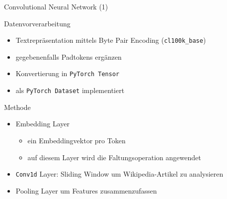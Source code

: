 \documentclass[aspectratio=169]{beamer} %
\begin{document}
\begin{frame}{Convolutional Neural Network (1)}
    \begin{block}{Datenvorverarbeitung}
        \begin{itemize}
            \item Textrepr\"asentation mittels Byte Pair Encoding (\texttt{cl100k\_base})

            \item gegebenenfalls Padtokens erg\"anzen
    
            \item Konvertierung in \texttt{PyTorch Tensor}

            \item als \texttt{PyTorch Dataset} implementiert
        \end{itemize}
    \end{block}

    \begin{block}{Methode}
        \begin{itemize}
            \item Embedding Layer
            \begin{itemize}
                \item ein Embeddingvektor pro Token

                \item auf diesem Layer wird die Faltungsoperation angewendet
            \end{itemize}

            \item \texttt{Conv1d} Layer: Sliding Window um Wikipedia-Artikel zu analysieren

            \item Pooling Layer um Features zusammenzufassen
        \end{itemize}
    \end{block}
\end{frame}
\end{document}
